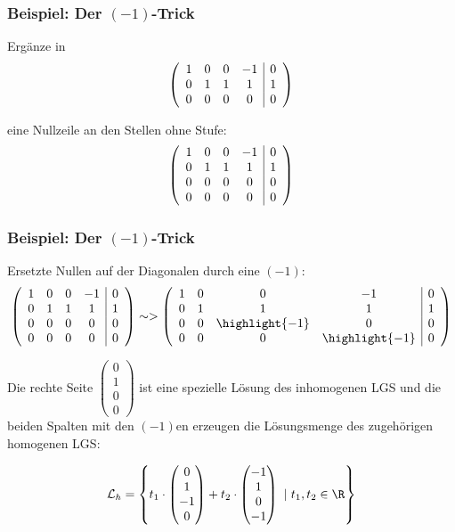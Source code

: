 \begin{frame}\frametitle{Beispiel: Der $(-1)$-Trick}

	Ergänze in 
	$$
		\left(
		\begin{array}{cccc | c}
			1 & 0 & 0 & -1 & 0\\
			0 & 1 & 1 & 1 & 1\\
			0 & 0 & 0 & 0 & 0
		\end{array}
		\right)
	$$
	
	\vspace{4mm}
	eine Nullzeile an den Stellen ohne Stufe:
	$$
	\left(
		\begin{array}{cccc | c}
			1 & 0 & 0 & -1 & 0\\
			0 & 1 & 1 & 1 & 1\\
			0 & 0 & 0 & 0 & 0\\
			0 & 0 & 0 & 0 & 0
		\end{array}
	\right)
	$$
	
\end{frame}
%
%
\begin{frame}\frametitle{Beispiel: Der $(-1)$-Trick}
	
	\vspace{2mm}
	Ersetzte Nullen auf der Diagonalen durch eine $(-1)$:
	$$
	\left(
	\begin{array}{cccc | c}
		1 & 0 & 0 & -1 & 0\\
		0 & 1 & 1 & 1 & 1\\
		0 & 0 & 0 & 0 & 0\\
		0 & 0 & 0 & 0 & 0
	\end{array}
	\right)
	\sim>
	\left(
	\begin{array}{cccc | c}
		1 & 0 & 0 		           	& -1 			& 0\\
		0 & 1 & 1 			   	& 1 			& 1\\
		0 & 0 & \highlight{-1} 	& 0 			& 0\\
		0 & 0 & 0 				& \highlight{-1} 	& 0
	\end{array}
	\right)
	$$
	
	\pause
	Die rechte Seite 
	$
		\begin{pmatrix}
			0\\ 1\\0\\0
		\end{pmatrix}
	$
	ist eine spezielle Lösung des inhomogenen LGS und die beiden Spalten mit den 
	$(-1)$en erzeugen die Lösungsmenge des zugehörigen homogenen LGS:
	
	$$
		\mathcal{L}_h = \left\{ 
				t_1
				\cdot
				\begin{pmatrix}
					0\\1\\-1\\0
				\end{pmatrix}
				+
				t_2
				\cdot
				\begin{pmatrix}
					-1\\1\\0\\-1
				\end{pmatrix}
				~|~
				t_1,t_2 \in \R
			 \right\}
	$$	
	
\end{frame}
